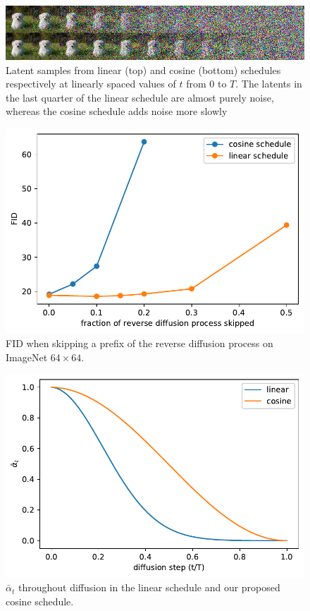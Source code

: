 \documentclass{article}
\begin{document}
\begin{figure}[t]
\begin{center}
\centerline{\includegraphics[width=\columnwidth]{linear_vs_cosine.png}}
\caption{\label{fig:noisingprocess} Latent samples from linear (top) and cosine (bottom) schedules respectively at linearly spaced values of $t$ from $0$ to $T$. The latents in the last quarter of the linear schedule are almost purely noise, whereas the cosine schedule adds noise more slowly}
\end{center}
\vskip -0.2in
\end{figure}

\begin{figure}[t]
\begin{center}
\centerline{\includegraphics[width=0.8\columnwidth]{skip_steps-eps.pdf}}
\caption{\label{fig:skipsteps} FID when skipping a prefix of the reverse diffusion process on ImageNet $64 \times 64$.}
\end{center}
\end{figure}

\begin{figure}[ht]
\begin{center}
\centerline{\includegraphics[width=0.8\columnwidth]{alpha_bar-eps.pdf}}
\caption{\label{fig:alphabar} $\bar{\alpha}_t$ throughout diffusion in the linear schedule and our proposed cosine schedule.}
\end{center}
\vskip -0.2in
\end{figure}
\end{document}
